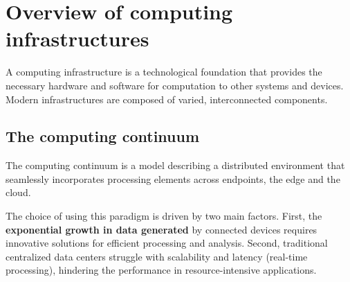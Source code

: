 \section{Overview of computing infrastructures}

A computing infrastructure is a technological foundation that provides the necessary hardware and software for computation to other systems and devices. Modern infrastructures are composed of varied, interconnected components.

\subsection{The computing continuum}

The computing continuum is a model describing a distributed environment that seamlessly incorporates processing elements across endpoints, the edge and the cloud.

The choice of using this paradigm is driven by two main factors. First, the \textbf{exponential growth in data generated} by connected devices requires innovative solutions for efficient processing and analysis. Second, traditional centralized data centers struggle with scalability and latency (real-time processing), hindering the performance in resource-intensive applications.

